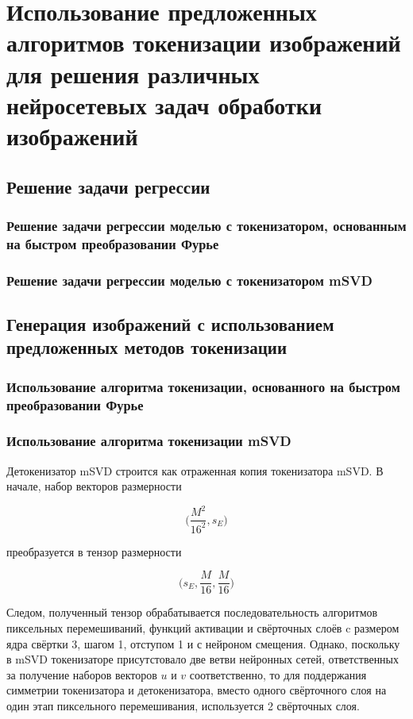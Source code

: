\documentclass[times,specification,annotation]{itmo-student-thesis}
\begin{document}
\chapter{Использование предложенных алгоритмов токенизации изображений для решения различных нейросетевых задач обработки изображений}

\section{Решение задачи регрессии}

\subsection{Решение задачи регрессии моделью с токенизатором, основанным на быстром преобразовании Фурье}


\subsection{Решение задачи регрессии моделью с токенизатором mSVD}


\section{Генерация изображений с использованием предложенных методов токенизации}

\subsection{Использование алгоритма токенизации, основанного на быстром преобразовании Фурье}


\subsection{Использование алгоритма токенизации mSVD}



Детокенизатор mSVD строится как отраженная копия токенизатора mSVD. В начале, набор векторов размерности

$$
\Big(\dfrac{M^2}{16^2}, s_E\Big)
$$

преобразуется в тензор размерности

$$
\Big(s_E, \dfrac{M}{16}, \dfrac{M}{16}\Big)
$$

Следом, полученный тензор обрабатывается последовательность алгоритмов пиксельных перемешиваний, функций активации и свёрточных слоёв c размером ядра свёртки 3, шагом 1, отступом 1 и с нейроном смещения. Однако, поскольку в mSVD токенизаторе присутстовало две ветви нейронных сетей, ответственных за получение наборов векторов $u$ и $v$ соответственно, то для поддержания симметрии токенизатора и детокенизатора, вместо одного свёрточного слоя на один этап пиксельного перемешивания, используется 2 свёрточных слоя.
\end{document}
